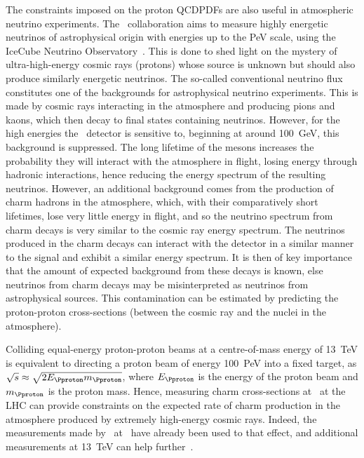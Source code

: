 The constraints imposed on the proton \acp{QCDPDF} are also useful in 
atmospheric neutrino experiments.
The \icecube\ collaboration aims to measure highly energetic neutrinos of 
astrophysical origin with energies up to the \si{\peta\eV} scale, using the 
IceCube Neutrino Observatory~\cite{Achterberg:2006md}.
This is done to shed light on the mystery of ultra-high-energy cosmic rays 
(protons) whose source is unknown but should also produce similarly energetic
neutrinos.
The so-called conventional neutrino flux constitutes one of the backgrounds for 
astrophysical neutrino experiments.
This is made by cosmic rays interacting in the atmosphere and producing pions 
and kaons, which then decay to final states containing neutrinos.
However, for the high energies the \icecube\ detector is sensitive to, 
beginning at around \SI{100}{\GeV}, this background is suppressed.
The long lifetime of the mesons increases the probability they will interact 
with the atmosphere in flight, losing energy through hadronic interactions, 
hence reducing the energy spectrum of the resulting neutrinos.
However, an additional background comes from the production of charm hadrons in 
the atmosphere, which, with their comparatively short lifetimes, lose very 
little energy in flight, and so the neutrino spectrum from charm decays is very 
similar to the cosmic ray energy spectrum.
The neutrinos produced in the charm decays can interact with the detector in a 
similar manner to the signal and exhibit a similar energy spectrum.
It is then of key importance that the amount of expected background from these 
decays is known, else neutrinos from charm decays may be misinterpreted as 
neutrinos from astrophysical sources.
This contamination can be estimated by predicting the proton-proton 
cross-sections (between the cosmic ray and the nuclei in the atmosphere).

Colliding equal-energy proton-proton beams at a centre-of-mass energy of 
\SI{13}{\TeV} is equivalent to directing a proton beam of energy 
\SI{100}{\peta\eV} into a fixed target, as $\sqrts \approx 
\sqrt{2E_{\Pproton}m_{\Pproton}}$, where $E_{\Pproton}$ is the energy of the 
proton beam and $m_{\Pproton}$ is the proton mass.
Hence, measuring charm cross-sections at \ at the \ac{LHC} can 
provide constraints on the expected rate of charm production in the atmosphere 
produced by extremely high-energy cosmic rays.
Indeed, the measurements made by \lhcb\ at \ have already been used 
to that effect, and additional measurements at \SI{13}{\TeV} can help 
further~\cite{Gauld:2015yia,Bhattacharya:2015jpa}.

